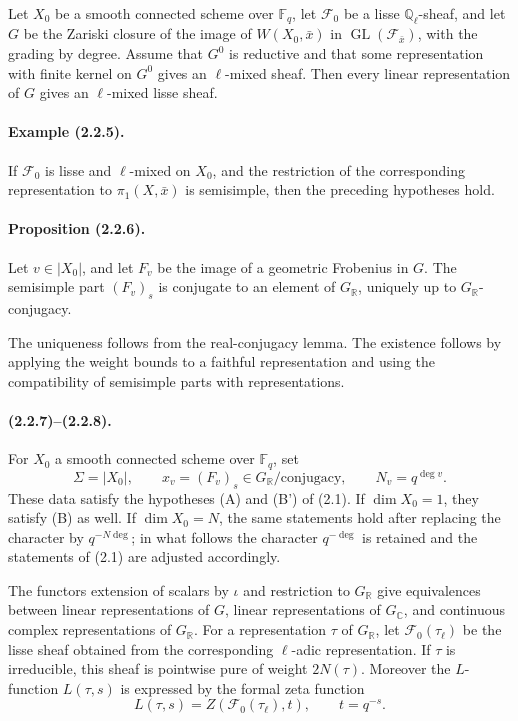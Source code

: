 \documentclass[11pt]{article}
\theoremstyle{remark}
\newcommand{\Ql}{\mathbb{Q}_\ell}
\newcommand{\CC}{\mathbb{C}}
\newcommand{\RR}{\mathbb{R}}
\newcommand{\Fq}{\mathbb{F}_q}
\begin{document}
Let \(X_0\) be a smooth connected scheme over \(\Fq\), let \(\mathcal F_0\) be a lisse \(\Ql\)-sheaf, and let \(G\) be the Zariski closure of the image of \(W(X_0,\bar x)\) in \(\operatorname{GL}(\mathcal F_{\bar x})\), with the grading by degree. Assume that \(G^0\) is reductive and that some representation with finite kernel on \(G^0\) gives an \(\ell\)-mixed sheaf. Then every linear representation of \(G\) gives an \(\ell\)-mixed lisse sheaf.

\paragraph{Example (2.2.5).}
If \(\mathcal F_0\) is lisse and \(\ell\)-mixed on \(X_0\), and the restriction of the corresponding representation to \(\pi_1(X,\bar x)\) is semisimple, then the preceding hypotheses hold.

\paragraph{Proposition (2.2.6).}
Let \(v\in|X_0|\), and let \(F_v\) be the image of a geometric Frobenius in \(G\). The semisimple part \((F_v)_s\) is conjugate to an element of \(G_\RR\), uniquely up to \(G_\RR\)-conjugacy.

The uniqueness follows from the real-conjugacy lemma. The existence follows by applying the weight bounds to a faithful representation and using the compatibility of semisimple parts with representations.

\paragraph{(2.2.7)--(2.2.8).}
For \(X_0\) a smooth connected scheme over \(\Fq\), set
\[
\Sigma=|X_0|,
\qquad
x_v=(F_v)_s\in G_\RR/\text{conjugacy},
\qquad
N_v=q^{\deg v}.
\]
These data satisfy the hypotheses (A) and (B') of (2.1). If \(\dim X_0=1\), they satisfy (B) as well. If \(\dim X_0=N\), the same statements hold after replacing the character by \(q^{-N\deg}\); in what follows the character \(q^{-\deg}\) is retained and the statements of (2.1) are adjusted accordingly.

The functors extension of scalars by \(\iota\) and restriction to \(G_\RR\) give equivalences between linear representations of \(G\), linear representations of \(G_\CC\), and continuous complex representations of \(G_\RR\). For a representation \(\tau\) of \(G_\RR\), let \(\mathcal F_0(\tau_\ell)\) be the lisse sheaf obtained from the corresponding \(\ell\)-adic representation. If \(\tau\) is irreducible, this sheaf is pointwise pure of weight \(2N(\tau)\). Moreover the \(L\)-function \(L(\tau,s)\) is expressed by the formal zeta function
\[
L(\tau,s)=Z(\mathcal F_0(\tau_\ell),t),\qquad t=q^{-s}.
\]
\end{document}
